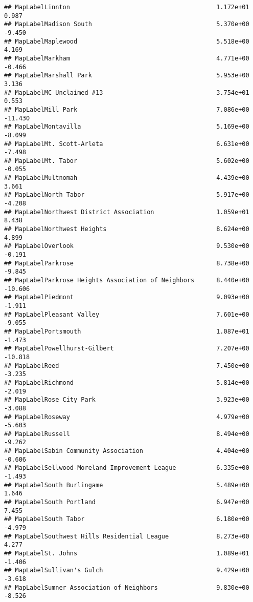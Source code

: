 \documentclass[]{article}
\begin{document}
\begin{verbatim}
## MapLabelLinnton                                        1.172e+01   0.987
## MapLabelMadison South                                  5.370e+00  -9.450
## MapLabelMaplewood                                      5.518e+00   4.169
## MapLabelMarkham                                        4.771e+00  -0.466
## MapLabelMarshall Park                                  5.953e+00   3.136
## MapLabelMC Unclaimed #13                               3.754e+01   0.553
## MapLabelMill Park                                      7.086e+00 -11.430
## MapLabelMontavilla                                     5.169e+00  -8.099
## MapLabelMt. Scott-Arleta                               6.631e+00  -7.498
## MapLabelMt. Tabor                                      5.602e+00  -0.055
## MapLabelMultnomah                                      4.439e+00   3.661
## MapLabelNorth Tabor                                    5.917e+00  -4.208
## MapLabelNorthwest District Association                 1.059e+01   8.438
## MapLabelNorthwest Heights                              8.624e+00   4.899
## MapLabelOverlook                                       9.530e+00  -0.191
## MapLabelParkrose                                       8.738e+00  -9.845
## MapLabelParkrose Heights Association of Neighbors      8.440e+00 -10.606
## MapLabelPiedmont                                       9.093e+00  -1.911
## MapLabelPleasant Valley                                7.601e+00  -9.055
## MapLabelPortsmouth                                     1.087e+01  -1.473
## MapLabelPowellhurst-Gilbert                            7.207e+00 -10.818
## MapLabelReed                                           7.450e+00  -3.235
## MapLabelRichmond                                       5.814e+00  -2.019
## MapLabelRose City Park                                 3.923e+00  -3.088
## MapLabelRoseway                                        4.979e+00  -5.603
## MapLabelRussell                                        8.494e+00  -9.262
## MapLabelSabin Community Association                    4.404e+00  -0.606
## MapLabelSellwood-Moreland Improvement League           6.335e+00  -1.493
## MapLabelSouth Burlingame                               5.489e+00   1.646
## MapLabelSouth Portland                                 6.947e+00   7.455
## MapLabelSouth Tabor                                    6.180e+00  -4.979
## MapLabelSouthwest Hills Residential League             8.273e+00   4.277
## MapLabelSt. Johns                                      1.089e+01  -1.406
## MapLabelSullivan's Gulch                               9.429e+00  -3.618
## MapLabelSumner Association of Neighbors                9.830e+00  -8.526

\end{verbatim}
\end{document}
